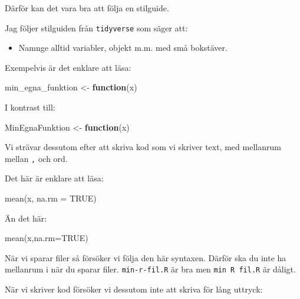 \documentclass[
]{book}
\newenvironment{Shaded}{\begin{snugshade}}{\end{snugshade}}
\newcommand{\AttributeTok}[1]{\textcolor[rgb]{0.77,0.63,0.00}{#1}}
\newcommand{\ConstantTok}[1]{\textcolor[rgb]{0.00,0.00,0.00}{#1}}
\newcommand{\ControlFlowTok}[1]{\textcolor[rgb]{0.13,0.29,0.53}{\textbf{#1}}}
\newcommand{\FunctionTok}[1]{\textcolor[rgb]{0.00,0.00,0.00}{#1}}
\newcommand{\NormalTok}[1]{#1}
\newcommand{\OtherTok}[1]{\textcolor[rgb]{0.56,0.35,0.01}{#1}}
\providecommand{\tightlist}{%
  \setlength{\itemsep}{0pt}\setlength{\parskip}{0pt}}
\begin{document}
Därför kan det vara bra att följa en stilguide.

Jag följer stilguiden från \texttt{tidyverse} som säger att:

\begin{itemize}
\tightlist
\item
  Namnge alltid variabler, objekt m.m. med små bokstäver.
\end{itemize}

Exempelvis är det enklare att läsa:

\begin{Shaded}
\begin{Highlighting}[]
\NormalTok{min\_egna\_funktion }\OtherTok{\textless{}{-}} \ControlFlowTok{function}\NormalTok{(x)}
\end{Highlighting}
\end{Shaded}

I kontrast till:

\begin{Shaded}
\begin{Highlighting}[]
\NormalTok{MinEgnaFunktion }\OtherTok{\textless{}{-}} \ControlFlowTok{function}\NormalTok{(x)}
\end{Highlighting}
\end{Shaded}

Vi strävar dessutom efter att skriva kod som vi skriver text, med mellanrum mellan \texttt{,} och ord.

Det här är enklare att läsa:

\begin{Shaded}
\begin{Highlighting}[]
\FunctionTok{mean}\NormalTok{(x, }\AttributeTok{na.rm =} \ConstantTok{TRUE}\NormalTok{)}
\end{Highlighting}
\end{Shaded}

Än det här:

\begin{Shaded}
\begin{Highlighting}[]
\FunctionTok{mean}\NormalTok{(x,}\AttributeTok{na.rm=}\ConstantTok{TRUE}\NormalTok{)}
\end{Highlighting}
\end{Shaded}

När vi sparar filer så försöker vi följa den här syntaxen. Därför ska du inte ha mellanrum i när du sparar filer. \texttt{min-r-fil.R} är bra men \texttt{min\ R\ fil.R} är dåligt.

När vi skriver kod försöker vi dessutom inte att skriva för lång uttryck:
\end{document}
